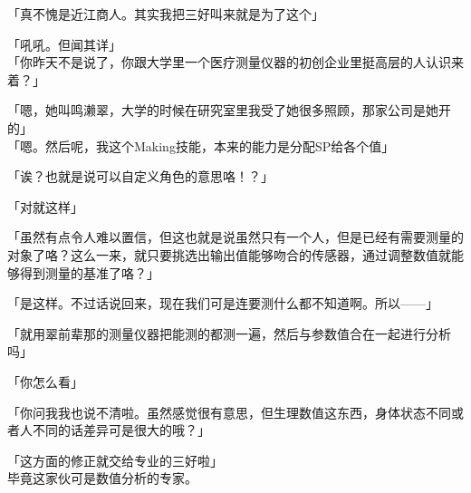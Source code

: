 「真不愧是近江商人。其实我把三好叫来就是为了这个」

「吼吼。但闻其详」\\

「你昨天不是说了，你跟大学里一个医疗测量仪器的初创企业里挺高层的人认识来着？」

「嗯，她叫鸣濑翠，大学的时候在研究室里我受了她很多照顾，那家公司是她开的」\\

「嗯。然后呢，我这个Making技能，本来的能力是分配SP给各个值」

「诶？也就是说可以自定义角色的意思咯！？」

「对就这样」

「虽然有点令人难以置信，但这也就是说虽然只有一个人，但是已经有需要测量的对象了咯？这么一来，就只要挑选出输出值能够吻合的传感器，通过调整数值就能够得到测量的基准了咯？」

「是这样。不过话说回来，现在我们可是连要测什么都不知道啊。所以——」

「就用翠前辈那的测量仪器把能测的都测一遍，然后与参数值合在一起进行分析吗」

「你怎么看」

「你问我我也说不清啦。虽然感觉很有意思，但生理数值这东西，身体状态不同或者人不同的话差异可是很大的哦？」

「这方面的修正就交给专业的三好啦」\\

毕竟这家伙可是数值分析的专家。\\

